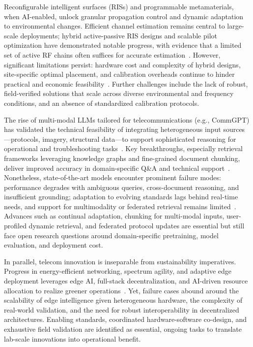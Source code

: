 \documentclass[sigconf]{acmart}
\begin{document}
Reconfigurable intelligent surfaces (RISs) and programmable metamaterials, when AI-enabled, unlock granular propagation control and dynamic adaptation to environmental changes. Efficient channel estimation remains central to large-scale deployments; hybrid active-passive RIS designs and scalable pilot optimization have demonstrated notable progress, with evidence that a limited set of active RF chains often suffices for accurate estimation~\cite{ref27,ref29,ref30,ref39,ref40}. However, significant limitations persist: hardware cost and complexity of hybrid designs, site-specific optimal placement, and calibration overheads continue to hinder practical and economic feasibility~\cite{ref27,ref29,ref30}. Further challenges include the lack of robust, field-verified solutions that scale across diverse environmental and frequency conditions, and an absence of standardized calibration protocols.

The rise of multi-modal LLMs tailored for telecommunications (e.g., CommGPT) has validated the technical feasibility of integrating heterogeneous input sources---protocols, imagery, structural data---to support sophisticated reasoning for operational and troubleshooting tasks~\cite{ref26,ref35}. Key breakthroughs, especially retrieval frameworks leveraging knowledge graphs and fine-grained document chunking, deliver improved accuracy in domain-specific Q\&A and technical support~\cite{ref26,ref35}. Nonetheless, state-of-the-art models encounter prominent failure modes: performance degrades with ambiguous queries, cross-document reasoning, and insufficient grounding; adaptation to evolving standards lags behind real-time needs, and support for multimodality or federated retrieval remains limited~\cite{ref20,ref21,ref22,ref26,ref35}. Advances such as continual adaptation, chunking for multi-modal inputs, user-profiled dynamic retrieval, and federated protocol updates are essential but still face open research questions around domain-specific pretraining, model evaluation, and deployment cost.

In parallel, telecom innovation is inseparable from sustainability imperatives. Progress in energy-efficient networking, spectrum agility, and adaptive edge deployment leverages edge AI, full-stack decentralization, and AI-driven resource allocation to realize greener operations~\cite{ref17,ref18,ref26,ref28,ref29,ref30,ref35,ref39,ref40}. Yet, failure cases abound around the scalability of edge intelligence given heterogeneous hardware, the complexity of real-world validation, and the need for robust interoperability in decentralized architectures. Enabling standards, coordinated hardware-software co-design, and exhaustive field validation are identified as essential, ongoing tasks to translate lab-scale innovations into operational benefit.
\end{document}

